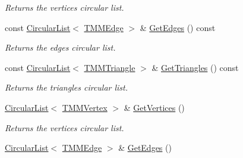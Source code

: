 \begin{DoxyCompactItemize}
\begin{DoxyCompactList}\small\item\em Returns the vertices circular list. \end{DoxyCompactList}\item 
\hypertarget{class_h_a_c_d_1_1_t_m_mesh_af29550c428f94cbdc8a557f2adfe8d2a}{const \hyperlink{class_h_a_c_d_1_1_circular_list}{Circular\+List}$<$ \hyperlink{class_h_a_c_d_1_1_t_m_m_edge}{T\+M\+M\+Edge} $>$ \& \hyperlink{class_h_a_c_d_1_1_t_m_mesh_af29550c428f94cbdc8a557f2adfe8d2a}{Get\+Edges} () const }\label{class_h_a_c_d_1_1_t_m_mesh_af29550c428f94cbdc8a557f2adfe8d2a}

\begin{DoxyCompactList}\small\item\em Returns the edges circular list. \end{DoxyCompactList}\item 
\hypertarget{class_h_a_c_d_1_1_t_m_mesh_aea91d18b2ffda1c473e17df1c8ba3144}{const \hyperlink{class_h_a_c_d_1_1_circular_list}{Circular\+List}$<$ \hyperlink{class_h_a_c_d_1_1_t_m_m_triangle}{T\+M\+M\+Triangle} $>$ \& \hyperlink{class_h_a_c_d_1_1_t_m_mesh_aea91d18b2ffda1c473e17df1c8ba3144}{Get\+Triangles} () const }\label{class_h_a_c_d_1_1_t_m_mesh_aea91d18b2ffda1c473e17df1c8ba3144}

\begin{DoxyCompactList}\small\item\em Returns the triangles circular list. \end{DoxyCompactList}\item 
\hypertarget{class_h_a_c_d_1_1_t_m_mesh_addd3536a0c980bdd55ac7163ff29c92a}{\hyperlink{class_h_a_c_d_1_1_circular_list}{Circular\+List}$<$ \hyperlink{class_h_a_c_d_1_1_t_m_m_vertex}{T\+M\+M\+Vertex} $>$ \& \hyperlink{class_h_a_c_d_1_1_t_m_mesh_addd3536a0c980bdd55ac7163ff29c92a}{Get\+Vertices} ()}\label{class_h_a_c_d_1_1_t_m_mesh_addd3536a0c980bdd55ac7163ff29c92a}

\begin{DoxyCompactList}\small\item\em Returns the vertices circular list. \end{DoxyCompactList}\item 
\hypertarget{class_h_a_c_d_1_1_t_m_mesh_abc42eb71cb0d6d4af33ae9edc3264088}{\hyperlink{class_h_a_c_d_1_1_circular_list}{Circular\+List}$<$ \hyperlink{class_h_a_c_d_1_1_t_m_m_edge}{T\+M\+M\+Edge} $>$ \& \hyperlink{class_h_a_c_d_1_1_t_m_mesh_abc42eb71cb0d6d4af33ae9edc3264088}{Get\+Edges} ()}\label{class_h_a_c_d_1_1_t_m_mesh_abc42eb71cb0d6d4af33ae9edc3264088}


\end{DoxyCompactItemize}
